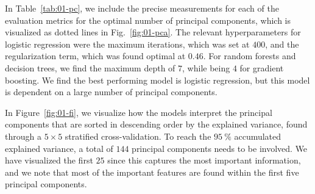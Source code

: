 \documentclass[superscriptaddress,unsortedaddress,
 amsmath,amssymb,
 aps,
]{revtex4-2}
\begin{document}
\begin{table}[t]
\centering
\caption{Optimal number of principal components and the respective scores (standard deviation) for each of the four ML models logistic regression (LOG), decision trees (DT), random forests (RF) and gradient boosting (GB) in the Ferrenti approach, as visualized by the dash-dotted line in Figure~\ref{fig:01-pca}.}
\label{tab:01-pc}
\noindent{}
\end{table}

In Table~\ref{tab:01-pc}, we include the precise measurements for each of the evaluation metrics for the optimal number of principal components, which is visualized as dotted lines in Fig.~\ref{fig:01-pca}. The relevant hyperparameters for logistic regression were the maximum iterations, which was set at $400$, and the regularization term, which was found optimal at $0.46$. For random forests and decision trees, we find the maximum depth of $7$, while being $4$ for gradient boosting. We find the best performing model is logistic regression, but this model is dependent on a large number of principal components. 

In Figure~\ref{fig:01-fi}, we visualize how the models interpret the principal components that are sorted in descending order by the explained variance, found through a $5\times 5$ stratified cross-validation. To reach the $95 \ \%$ accumulated explained variance, a total of $144$ principal components needs to be involved. We have visualized the first $25$ since this captures the most important information, and we note that most of the important features are found within the first five principal components.
\end{document}
